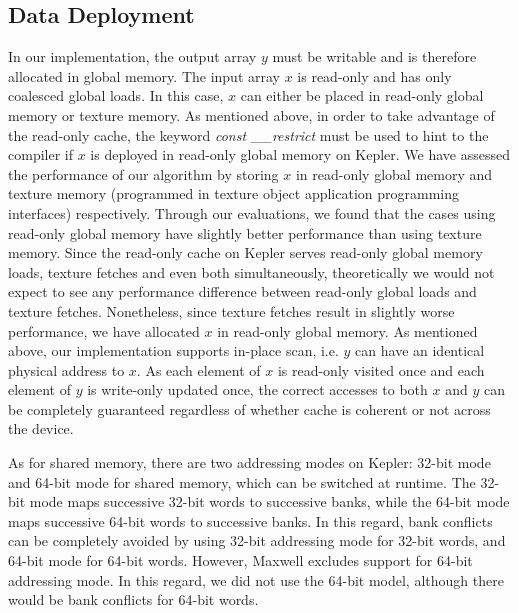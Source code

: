 \documentclass[article]{elsarticle}
\begin{document}
{\subsection{Data Deployment}
In our implementation, the output array $y$ must be writable and is therefore allocated in global memory. The input array $x$ is read-only and has only coalesced global loads. In this case, $x$ can either be placed in read-only global memory or texture memory. As mentioned above, in order to take advantage of the read-only cache, the keyword \textit{const \_\_restrict} must be used to hint to the compiler if $x$ is deployed in read-only global memory on Kepler. We have assessed the performance of our algorithm by storing $x$ in read-only global memory and texture memory (programmed in texture object application programming interfaces) respectively. Through our evaluations, we found that the cases using read-only global memory have slightly better performance than using texture memory. Since the read-only cache on Kepler serves read-only global memory loads, texture fetches and even both simultaneously, theoretically we would not expect to see any performance difference between read-only global loads and texture fetches. Nonetheless, since texture fetches result in slightly worse performance, we have allocated $x$ in read-only global memory. As mentioned above, our implementation supports in-place scan, i.e. $y$ can have an identical physical address to $x$. As each element of $x$ is read-only visited once and each element of $y$ is write-only updated once, the correct accesses to both $x$ and $y$ can be completely guaranteed regardless of whether cache is coherent or not across the device.

As for shared memory, there are two addressing modes on Kepler: 32-bit mode and 64-bit mode for shared memory, which can be switched at runtime. The 32-bit mode maps successive 32-bit words to successive banks, while the 64-bit mode maps successive 64-bit words to successive banks. In this regard, bank conflicts can be completely avoided by using 32-bit addressing mode for 32-bit words, and 64-bit mode for 64-bit words. However, Maxwell excludes support for 64-bit addressing mode. In this regard, we did not use the 64-bit model, although there would be bank conflicts for 64-bit words.
}
\end{document}
